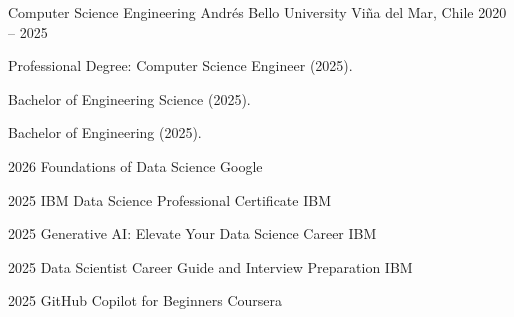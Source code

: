 
\begin{cventries}

\cventry
  {Computer Science Engineering}
  {Andrés Bello University}
  {Viña del Mar, Chile}
  {2020 -- 2025}
  {
    \begin{cvitems}
      \item {Professional Degree: Computer Science Engineer (2025).}
      \item {Bachelor of Engineering Science (2025).}
      \item {Bachelor of Engineering (2025).}
    \end{cvitems}
  }

\end{cventries}


\begin{cventries}

\cventry
  {2026}
  {Foundations of Data Science}
  {Google}
  {}
  {}

\cventry
  {2025}
  {IBM Data Science Professional Certificate}
  {IBM}
  {}
  {}

\cventry
  {2025}
  {Generative AI: Elevate Your Data Science Career}
  {IBM}
  {}
  {}

\cventry
  {2025}
  {Data Scientist Career Guide and Interview Preparation}
  {IBM}
  {}
  {}

\cventry
  {2025}
  {GitHub Copilot for Beginners}
  {Coursera}
  {}
  {}

\end{cventries}